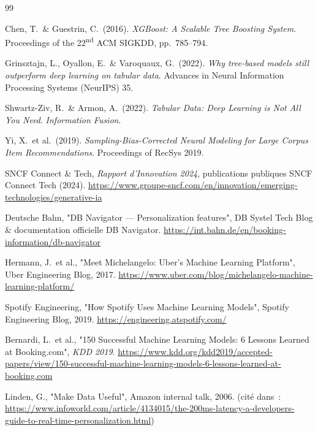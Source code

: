 \documentclass[12pt, a4paper]{report}
\begin{document}
\begin{thebibliography}{99}

    Chen, T.\ \& Guestrin, C.\ (2016). \textit{XGBoost: A Scalable Tree
    Boosting System}. Proceedings of the 22\textsuperscript{nd} ACM SIGKDD,
    pp.\ 785--794.

    Grinsztajn, L., Oyallon, E.\ \& Varoquaux, G.\ (2022). \textit{Why
    tree-based models still outperform deep learning on tabular data}.
    Advances in Neural Information Processing Systems (NeurIPS) 35.

    Shwartz-Ziv, R.\ \& Armon, A.\ (2022). \textit{Tabular Data: Deep
    Learning is Not All You Need}. \textit{Information Fusion}.

    Yi, X.\ et al.\ (2019). \textit{Sampling-Bias-Corrected Neural Modeling
    for Large Corpus Item Recommendations}. Proceedings of RecSys 2019.

    SNCF Connect \& Tech, \textit{Rapport d'Innovation 2024},
    publications publiques SNCF Connect Tech (2024).
    \url{https://www.groupe-sncf.com/en/innovation/emerging-technologies/generative-ia}

    Deutsche Bahn, "DB Navigator --- Personalization features",
    DB Systel Tech Blog \& documentation officielle DB Navigator.
    \url{https://int.bahn.de/en/booking-information/db-navigator}

    Hermann, J.\ et al., "Meet Michelangelo: Uber's Machine Learning Platform",
    Uber Engineering Blog, 2017.
    \url{https://www.uber.com/blog/michelangelo-machine-learning-platform/}

    Spotify Engineering, "How Spotify Uses Machine Learning Models",
    Spotify Engineering Blog, 2019.
    \url{https://engineering.atspotify.com/}

    Bernardi, L.\ et al., "150 Successful Machine Learning Models:
    6 Lessons Learned at Booking.com", \textit{KDD 2019}.
    \url{https://www.kdd.org/kdd2019/accepted-papers/view/150-successful-machine-learning-models-6-lessons-learned-at-booking.com}

    Linden, G., "Make Data Useful", Amazon internal talk, 2006.
    (cité dans~: \url{https://www.infoworld.com/article/4134015/the-200ms-latency-a-developers-guide-to-real-time-personalization.html})


\end{thebibliography}
\end{document}
